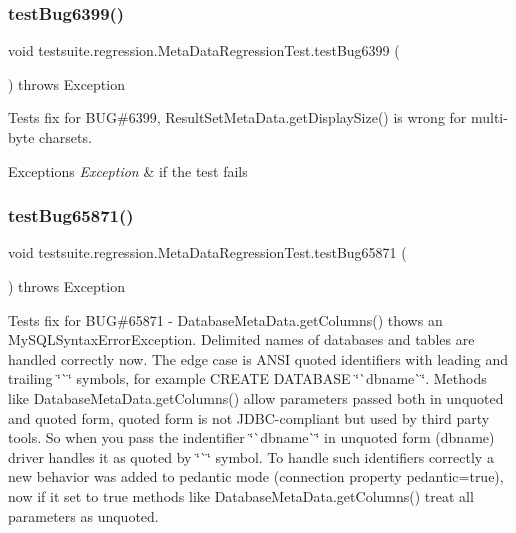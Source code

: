 \subsubsection{\texorpdfstring{test\+Bug6399()}{testBug6399()}}
{\footnotesize\ttfamily void testsuite.\+regression.\+Meta\+Data\+Regression\+Test.\+test\+Bug6399 (\begin{DoxyParamCaption}{ }\end{DoxyParamCaption}) throws Exception}

Tests fix for B\+UG\#6399, Result\+Set\+Meta\+Data.\+get\+Display\+Size() is wrong for multi-\/byte charsets.


\begin{DoxyExceptions}{Exceptions}
{\em Exception} & if the test fails \\
\hline
\end{DoxyExceptions}
\mbox{\label{classtestsuite_1_1regression_1_1_meta_data_regression_test_a8cde8eefe9689a7113484b6de4827afd}} 
\subsubsection{\texorpdfstring{test\+Bug65871()}{testBug65871()}}
{\footnotesize\ttfamily void testsuite.\+regression.\+Meta\+Data\+Regression\+Test.\+test\+Bug65871 (\begin{DoxyParamCaption}{ }\end{DoxyParamCaption}) throws Exception}

Tests fix for B\+UG\#65871 -\/ Database\+Meta\+Data.\+get\+Columns() thows an My\+S\+Q\+L\+Syntax\+Error\+Exception. Delimited names of databases and tables are handled correctly now. The edge case is A\+N\+SI quoted identifiers with leading and trailing \char`\"{}\`{}\char`\"{} symbols, for example C\+R\+E\+A\+TE D\+A\+T\+A\+B\+A\+SE \char`\"{}\`{}dbname\`{}\char`\"{}. Methods like Database\+Meta\+Data.\+get\+Columns() allow parameters passed both in unquoted and quoted form, quoted form is not J\+D\+B\+C-\/compliant but used by third party tools. So when you pass the indentifier \char`\"{}\`{}dbname\`{}\char`\"{} in unquoted form ({\ttfamily dbname}) driver handles it as quoted by \char`\"{}\`{}\char`\"{} symbol. To handle such identifiers correctly a new behavior was added to pedantic mode (connection property pedantic=true), now if it set to true methods like Database\+Meta\+Data.\+get\+Columns() treat all parameters as unquoted.


